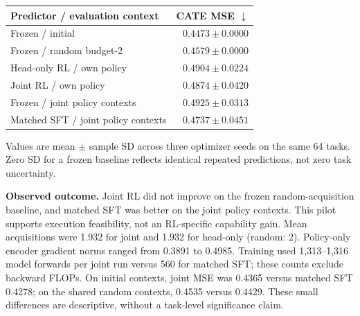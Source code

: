 \begin{center}\small
\begin{tabular}{@{}lr@{}}
\toprule
Predictor / evaluation context & CATE MSE $\downarrow$\\
\midrule
Frozen / initial & $0.4473 \pm 0.0000$\\
Frozen / random budget-2 & $0.4579 \pm 0.0000$\\
Head-only RL / own policy & $0.4904 \pm 0.0224$\\
Joint RL / own policy & $0.4874 \pm 0.0420$\\
Frozen / joint policy contexts & $0.4925 \pm 0.0313$\\
Matched SFT / joint policy contexts & $0.4737 \pm 0.0451$\\
\bottomrule
\end{tabular}\end{center}
{\footnotesize Values are mean $\pm$ sample SD across three optimizer seeds on the same 64 tasks. Zero SD for a frozen baseline reflects identical repeated predictions, not zero task uncertainty.}
\par\textbf{Observed outcome.} Joint RL did not improve on the frozen random-acquisition baseline, and matched SFT was better on the joint policy contexts. This pilot supports execution feasibility, not an RL-specific capability gain.
Mean acquisitions were 1.932 for joint and 1.932 for head-only (random: 2). Policy-only encoder gradient norms ranged from 0.3891 to 0.4985. Training used 1,313--1,316 model forwards per joint run versus 560 for matched SFT; these counts exclude backward FLOPs.
On initial contexts, joint MSE was 0.4365 versus matched SFT 0.4278; on the shared random contexts, 0.4535 versus 0.4429. These small differences are descriptive, without a task-level significance claim.
